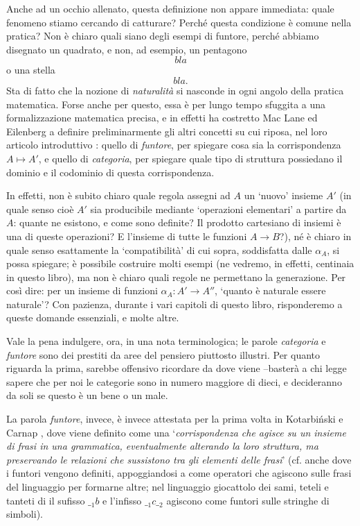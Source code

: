Anche ad un occhio allenato, questa definizione non appare immediata: quale fenomeno stiamo cercando di catturare? Perché questa condizione è comune nella pratica? Non è chiaro quali siano degli esempi di funtore, perché abbiamo disegnato un quadrato, e non, ad esempio, un pentagono
\[bla\]
o una stella
\[bla.\]
Sta di fatto che la nozione di \emph{naturalità} si nasconde in ogni angolo della pratica matematica. Forse anche per questo, essa è per lungo tempo sfuggita a una formalizzazione matematica precisa, e in effetti ha costretto Mac Lane ed Eilenberg a definire preliminarmente gli altri concetti su cui riposa, nel loro articolo introduttivo \cite{gtone}: quello di \emph{funtore}, per spiegare cosa sia la corrispondenza \(A\mapsto A'\), e quello di \emph{categoria}, per spiegare quale tipo di struttura possiedano il dominio e il codominio di questa corrispondenza.

In effetti, non è subito chiaro quale regola assegni ad \(A\) un `nuovo' insieme \(A'\) (in quale senso cioè \(A'\) sia producibile mediante `operazioni elementari' a partire da \(A\): quante ne esistono, e come sono definite? Il prodotto cartesiano di insiemi è una di queste operazioni? E l'insieme di tutte le funzioni \(A\to B\)?), né è chiaro in quale senso esattamente la `compatibilità' di cui sopra, soddisfatta dalle \(\alpha_A\), si possa spiegare; è possibile costruire molti esempi (ne vedremo, in effetti, centinaia in questo libro), ma non è chiaro quali regole ne permettano la generazione. Per così dire: per un insieme di funzioni \(\alpha_A : A' \to A''\), `quanto è naturale essere naturale'? Con pazienza, durante i vari capitoli di questo libro, risponderemo a queste domande essenziali, e molte altre.

\medskip
Vale la pena indulgere, ora, in una nota terminologica; le parole \emph{categoria} e \emph{funtore} sono dei prestiti da aree del pensiero piuttosto illustri. Per quanto riguarda la prima, sarebbe offensivo ricordare da dove viene --basterà a chi legge sapere che per noi le categorie sono in numero maggiore di dieci, e decideranno da soli se questo è un bene o un male.

La parola \emph{funtore}, invece, è invece attestata per la prima volta in Kotarbi\'nski \cite{kotarbione} e Carnap \cite{carnappio}, dove viene definito come una `\emph{corrispondenza che agisce su un insieme di frasi in una grammatica, eventualmente alterando la loro struttura, ma preservando le relazioni che sussistono tra gli elementi delle frasi}' (cf. anche \cite{Curry1961SomeLA} dove i funtori vengono definiti, appoggiandosi a \cite{kotarbione} come operatori che agiscono sulle frasi del linguaggio per formarne altre; nel linguaggio giocattolo dei sami, teteli e tanteti di \cite{Curry1961SomeLA} il sufisso \({\_}_1b\) e l'infisso \({\_}_1 c {\_}_2\) agiscono come funtori sulle stringhe di simboli).

